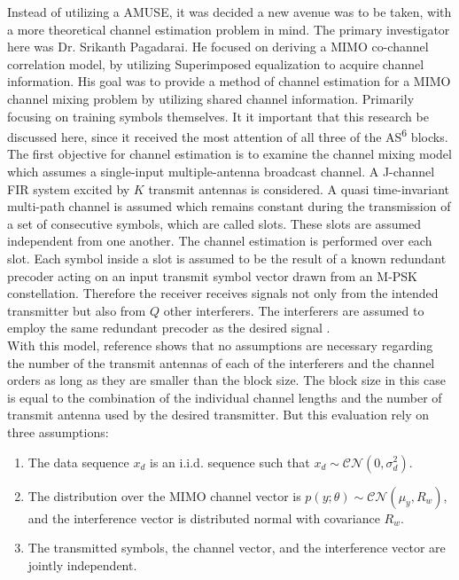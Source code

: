 Instead of utilizing a AMUSE, it was decided a new avenue was to be taken, with a more theoretical channel estimation problem in mind.  The primary investigator here was Dr. Srikanth Pagadarai.  He focused on deriving a MIMO co-channel correlation model, by utilizing Superimposed equalization to acquire channel information.  His goal was to provide a method of channel estimation for a MIMO channel mixing problem by utilizing shared channel information.  Primarily focusing on training symbols themselves.  It it important that this research be discussed here, since it received the most attention of all three of the AS\textsuperscript{6} blocks.\\

The first objective for channel estimation is to examine the channel mixing model which assumes a single-input multiple-antenna broadcast channel.  A J-channel FIR system excited by \(K\) transmit antennas is considered. A quasi time-invariant multi-path channel is assumed which remains constant during the transmission of a set of consecutive symbols, which are called slots. These slots are assumed independent from one another.  The channel estimation is performed over each slot. Each symbol inside a slot is assumed to be the result of a known redundant precoder acting on an input transmit symbol vector drawn from an M-PSK constellation. Therefore the receiver receives signals not only from the intended transmitter but also from \(Q\) other interferers. The interferers are assumed to employ the same redundant precoder as the desired signal \cite{skrkantPHD}.\\

With this model, reference \cite{midterm_report} shows that no assumptions are necessary regarding the number of the transmit antennas of each of the interferers and the channel orders as long as they are smaller than the block size.  The block size in this case is equal to the combination of the individual channel lengths and the number of transmit antenna used by the desired transmitter.  But this evaluation rely on three assumptions:

\begin{enumerate}
\item The data sequence \(x_{d}\) is an i.i.d. sequence such that \(x_{d}\sim\mathcal{CN}(0,\sigma_{d}^{2})\).

\item The distribution over the MIMO channel vector is \(p(y;\theta)\sim\mathcal{CN}(\mu_{y},R_{w})\), and the interference vector is distributed normal with covariance \(R_{w}\).

\item The transmitted symbols, the channel vector, and the interference vector are jointly independent.
\end{enumerate}


